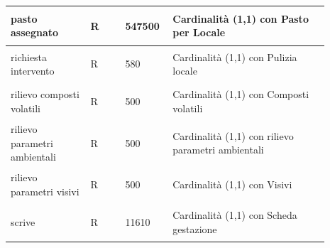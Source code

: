 \documentclass[12pt,a4paper]{article}
\begin{document}
\begin{center}
\begin{longtable}{|p{0.23\linewidth}|p{0.1\linewidth}|p{0.11\linewidth}|p{0.45\linewidth}|}
\hline
pasto assegnato 				& \begin{center}
\vspace{-25pt}R
\end{center}
					& \begin{center}
					\vspace{-25pt}547500\end{center}
					&  Cardinalità (1,1) con Pasto per Locale \\ 

\hline
richiesta intervento 				& \begin{center}
\vspace{-25pt}R
\end{center}
					& \begin{center}
					\vspace{-25pt}580\end{center}
					&  Cardinalità (1,1) con Pulizia locale \\ 

\hline
rilievo composti volatili 				& \begin{center}
\vspace{-25pt}R
\end{center}
					& \begin{center}
					\vspace{-25pt}500\end{center}
					&  Cardinalità (1,1) con Composti volatili \\ 

\hline
rilievo parametri ambientali 				& \begin{center}
\vspace{-25pt}R
\end{center}
					& \begin{center}
					\vspace{-25pt}500\end{center}
					&  Cardinalità (1,1) con rilievo parametri ambientali \\ 

\hline
rilievo parametri visivi 				& \begin{center}
\vspace{-25pt}R
\end{center}
					& \begin{center}
					\vspace{-25pt}500\end{center}
					&  Cardinalità (1,1) con Visivi \\ 

\hline
scrive 				& \begin{center}
\vspace{-25pt}R
\end{center}
					& \begin{center}
					\vspace{-25pt}11610\end{center}
					&  Cardinalità (1,1) con Scheda gestazione \\ 


\end{longtable}
\end{center}
\end{document}
